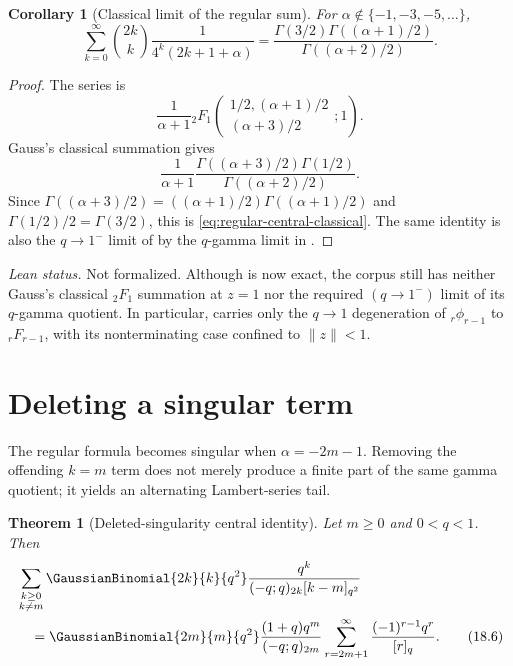 \documentclass[11pt,a4paper,oneside,openany]{book}
\newtheorem{theorem}{Theorem}[chapter]
\newtheorem{corollary}[corollary]{Corollary}
\theoremstyle{definition}
\theoremstyle{remark}
\begin{document}
\begin{corollary}[Classical limit of the regular sum]\label{cor:regular-central-classical}
For $\alpha\notin\{-1,-3,-5,\ldots\}$,
\[
 \sum_{k=0}^{\infty}\binom{2k}{k}
 \frac1{4^k(2k+1+\alpha)}
 =\frac{\Gamma(3/2)\Gamma((\alpha+1)/2)}
        {\Gamma((\alpha+2)/2)}.
 \tag{18.5}\label{eq:regular-central-classical}
\]
\end{corollary}

\begin{proof}
The series is
\[
 \frac1{\alpha+1}
 {}_2F_1\!\left(
 \begin{matrix}1/2,(\alpha+1)/2\\(\alpha+3)/2\end{matrix};1\right).
\]
Gauss's classical summation gives
\[
 \frac1{\alpha+1}
 \frac{\Gamma((\alpha+3)/2)\Gamma(1/2)}
      {\Gamma((\alpha+2)/2)}.
\]
Since $\Gamma((\alpha+3)/2)=((\alpha+1)/2)\Gamma((\alpha+1)/2)$ and $\Gamma(1/2)/2=\Gamma(3/2)$, this is \eqref{eq:regular-central-classical}.  The same identity is also the $q\to1^-$ limit of  by the $q$-gamma limit in .
\end{proof}
\emph{Lean status.}  Not formalized.  Although
 is now exact, the corpus still has neither
Gauss's classical \({}_2F_1\) summation at \(z=1\) nor the required
\((q\to1^-)\) limit of its \(q\)-gamma quotient.  In particular,
 carries only the \(q\to1\)
degeneration of \({}_r\phi_{r-1}\) to \({}_rF_{r-1}\), with its
nonterminating case confined to \(\lVert z\rVert<1\).


\section{Deleting a singular term}

The regular formula becomes singular when $\alpha=-2m-1$.  Removing the offending $k=m$ term does not merely produce a finite part of the same gamma quotient; it yields an alternating Lambert-series tail.

\begin{theorem}[Deleted-singularity central identity]\label{thm:singular-central}
Let $m\ge0$ and $0<q<1$.  Then
\begin{align}
 &\sum_{\substack{k\ge0\\k\ne m}}
 \GaussianBinomial{2k}{k}{q^2}
 \frac{q^k}{(-q;q)_{2k}[k-m]_{q^2}}
 \notag\\
 &\quad=
 \GaussianBinomial{2m}{m}{q^2}
 \frac{(1+q)q^m}{(-q;q)_{2m}}
 \sum_{r=2m+1}^{\infty}
 \frac{(-1)^{r-1}q^r}{[r]_q}.
 \tag{18.6}\label{eq:singular-central}
\end{align}
\end{theorem}
\end{document}
